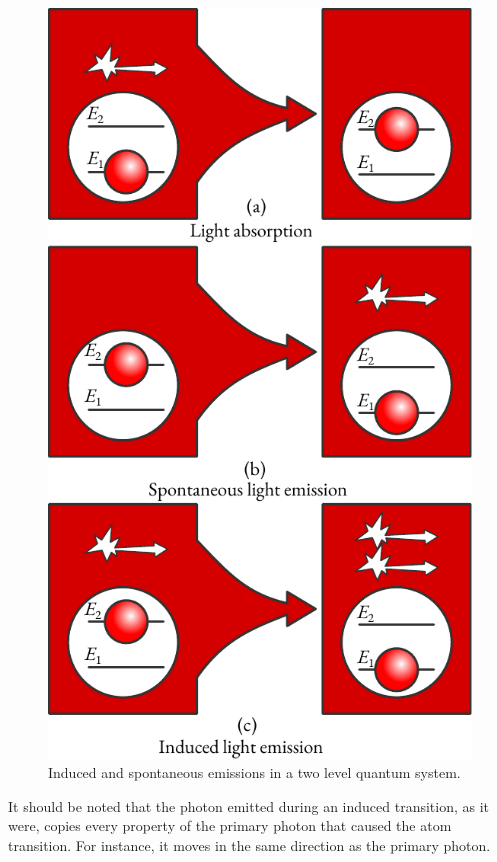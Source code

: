 \begin{figure}[!ht]
\centering
\includegraphics[width=0.7\tfwidth]{figures/emission.pdf}
\caption{Induced and spontaneous emissions in a two level quantum system.\label{emission}}
\end{figure}


It should be noted that the photon emitted during an induced
transition, as it were, copies every property of the primary photon that
caused the atom transition. For instance, it moves in the same direction
as the primary photon.


